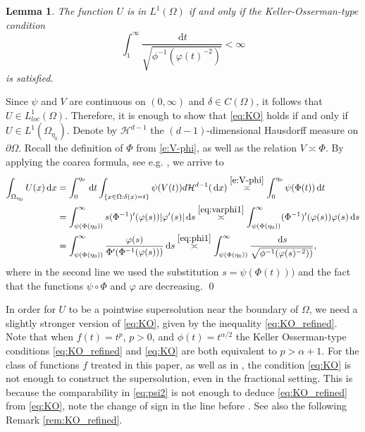 \documentclass[a4paper,12pt,draft]{article}
\theoremstyle{plain}
\newtheorem{lemma}[thm]{Lemma}
\theoremstyle{definition}
\numberwithin{equation}{section}
\newcommand{\1}{1}
\newcommand{\ds} {\, \mathrm{d}s}
\newcommand{\dt} {\, \mathrm{d}t}
\newcommand{\dx} {\, \mathrm{d}x}
\begin{document}
\begin{lemma}\label{lem:integrability}
 The function $U$ is in $L^1(\Omega)$ if and only if  the Keller-Osserman-type condition
\begin{equation}\label{eq:KO}
\int_1^\infty \frac{\dt}{\sqrt{\phi^{-1}(\varphi(t)^{-2})}}<\infty
\end{equation}
is satisfied.
\end{lemma} 
\proof
Since  $\psi$ and $V$ are continuous on $(0,\infty)$ and $\delta\in C(\Omega)$, it follows that $U\in L^1_{loc}(\Omega)$. Therefore, it is enough to show that \eqref{eq:KO} holds if and only if $U\in L^1(\Omega_{\eta_0})$. Denote by $\mathcal H^{d-1}$ the $(d-1)$-dimensional Hausdorff measure on $\partial\Omega$. Recall the definition of $\Phi$ from \eqref{e:V-phi}, as well as the relation $V\asymp \Phi$. By applying the coarea formula, see e.g. \cite[Theorem 3.5.6]{DZ}, we arrive to
\begin{align*}
\int_{\Omega_{\eta_0}}U(x)\dx&=\int_0^{\eta_0} \dt\int_{\{x\in\Omega:\delta(x)=t\}}\psi(V(t))d\mathcal H^{d-1}(\dx)\overset{\eqref{e:V-phi}}{\asymp} \int_0^{\eta_0}\psi(\Phi(t))\dt\\
&= \int_{\psi(\Phi(\eta_0))}^\infty s(\Phi^{-1})'(\varphi(s))|\varphi'(s)|\ds\overset{\eqref{eq:varphi1}}{\asymp} \int_{\psi(\Phi(\eta_0))}^\infty (\Phi^{-1})'(\varphi(s))\varphi(s)\ds\\
&=\int_{\psi(\Phi(\eta_0))}^\infty \frac{\varphi(s)}{\Phi'(\Phi^{-1}(\varphi(s)))}\ds\overset{\eqref{eq:phi1}}{\asymp}\int_{\psi(\Phi(\eta_0))}^\infty \frac{\ds}{\sqrt{\phi^{-1}(\varphi(s)^{-2}))}},
\end{align*}
where in the second line we used the substitution $s=\psi(\Phi(t)))$ and the fact that the functions $\psi\circ\Phi$ and $\varphi$ are decreasing.
\qed

In order for $U$ to be a pointwise supersolution near the boundary of $\Omega$, we need a slightly stronger version of \eqref{eq:KO}, given by the inequality \eqref{eq:KO_refined}. Note that when $f(t)=t^p$, $p>0$, and $\phi(t)=t^{\alpha/2}$ the Keller Osserman-type conditions \eqref{eq:KO_refined} and \eqref{eq:KO} are both equivalent to $p>\alpha+1$. For the class of functions $f$ treated in this paper, as well as in \cite{abatangelo2}, the condition \eqref{eq:KO} is not enough to construct the supersolution, even in the fractional setting. This is because the comparability in \eqref{eq:psi2} is not enough to deduce \eqref{eq:KO_refined} from \eqref{eq:KO}, note the change of sign in the line before \cite[(1.29)]{abatangelo2}. See also the following Remark \ref{rem:KO_refined}.
\end{document}
